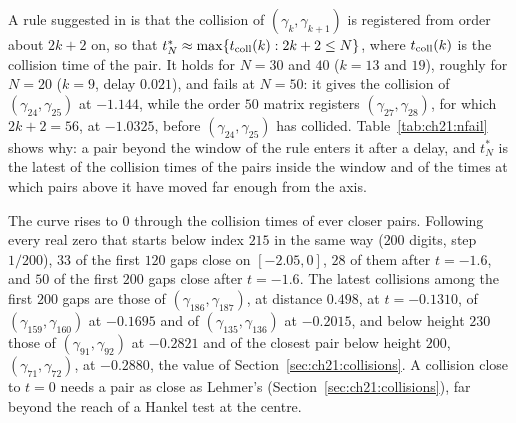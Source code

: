 A rule suggested in \cite{P26wig} is that the collision of $(\gamma_k,\gamma_{k+1})$ is registered from order about $2k+2$ on, so that $t^*_N\approx\max\{t_{\rm coll}(k):2k+2\le N\}$, where $t_{\rm coll}(k)$ is the collision time of the pair. It holds for $N=30$ and $40$ ($k=13$ and $19$), roughly for $N=20$ ($k=9$, delay $0.021$), and fails at $N=50$: it gives the collision of $(\gamma_{24},\gamma_{25})$ at $-1.144$, while the order $50$ matrix registers $(\gamma_{27},\gamma_{28})$, for which $2k+2=56$, at $-1.0325$, before $(\gamma_{24},\gamma_{25})$ has collided. Table~\ref{tab:ch21:nfail} shows why: a pair beyond the window of the rule enters it after a delay, and $t^*_N$ is the latest of the collision times of the pairs inside the window and of the times at which pairs above it have moved far enough from the axis.

The curve rises to $0$ through the collision times of ever closer pairs. Following every real zero that starts below index $215$ in the same way ($200$ digits, step $1/200$), $33$ of the first $120$ gaps close on $[-2.05,0]$, $28$ of them after $t=-1.6$, and $50$ of the first $200$ gaps close after $t=-1.6$. The latest collisions among the first $200$ gaps are those of $(\gamma_{186},\gamma_{187})$, at distance $0.498$, at $t=-0.1310$, of $(\gamma_{159},\gamma_{160})$ at $-0.1695$ and of $(\gamma_{135},\gamma_{136})$ at $-0.2015$, and below height $230$ those of $(\gamma_{91},\gamma_{92})$ at $-0.2821$ and of the closest pair below height $200$, $(\gamma_{71},\gamma_{72})$, at $-0.2880$, the value of Section~\ref{sec:ch21:collisions}. A collision close to $t=0$ needs a pair as close as Lehmer's (Section~\ref{sec:ch21:collisions}), far beyond the reach of a Hankel test at the centre.

